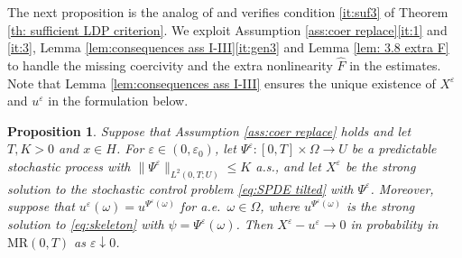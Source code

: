 \documentclass{amsart}
\renewcommand{\MR}{\mathrm{MR}}
\newcommand{\<}{\langle}
\newcommand{\?}{\rangle}
\newcommand{\col}{\colon}
\newcommand{\bphieps}{\Psi^{\eps}}
\theoremstyle{plain}
\theoremstyle{remark}
\theoremstyle{plain}
\newtheorem{proposition}[theorem]{Proposition}
\numberwithin{equation}{section}
\newcommand{\om}{\omega}
\newcommand{\Om}{\Omega}
\newcommand{\eps}{\varepsilon}
\begin{document}
The next proposition is the analog of \cite[Prop.\ 4.12]{TV24} and verifies condition \ref{it:suf3} of Theorem \ref{th: sufficient LDP criterion}. We exploit Assumption \ref{ass:coer replace}\ref{it:1} and \ref{it:3}, Lemma \ref{lem:consequences ass I-III}\ref{it:gen3}   and Lemma \ref{lem: 3.8 extra F} to handle the missing coercivity and the extra nonlinearity $\hat{F}$ in the estimates. Note that  Lemma \ref{lem:consequences ass I-III} ensures the unique existence of $X^\eps$ and $u^\eps$ in the formulation below. 

\begin{proposition}\label{prop: X^eps weak conv}
Suppose that Assumption \ref{ass:coer replace} holds and let $T,K>0$ and $x\in H$. For $\eps\in(0,\eps_0)$, let $\bphieps\col [0,T]\times \Om\to U$  be a predictable stochastic process with   $\|\bphieps\|_{L^2(0,T;U)}\leq K$ a.s., and let $X^\eps$ be the strong solution to the stochastic control problem \eqref{eq:SPDE tilted} with $\bphieps$. 
Moreover, suppose that $u^\eps(\om)=u^{\bphieps(\om)}$ for a.e.\ $\om\in\Om$, where $u^{\bphieps(\om)}$  is the strong solution  to \eqref{eq:skeleton} with $\psi=\Psi^\eps(\om)$. 
Then $X^\eps- u^{\eps}\to 0$ in probability in $\MR(0,T)$ as $\eps\downarrow0$.
\end{proposition} 
\end{document}

